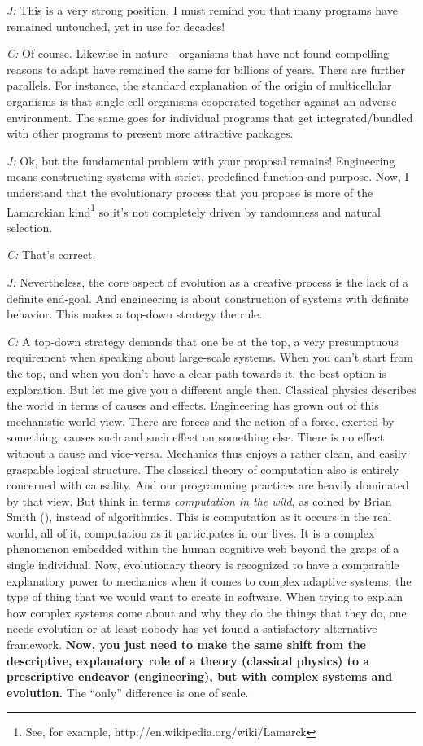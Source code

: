 \documentclass[10pt]{sigplanconf}
\begin{document}
\emph{J:} This is a very strong position. I must remind you that many programs have remained untouched, yet in use for decades!

\emph{C:} Of course. Likewise in nature - organisms that have not found compelling reasons to adapt have remained the same for billions of years. There are further parallels. For instance, the standard explanation of the origin of multicellular organisms is that single-cell organisms cooperated together against an adverse environment. The same goes for individual programs that get integrated/bundled with other programs to present more attractive packages.

\emph{J:} Ok, but the fundamental problem with your proposal remains! Engineering means constructing systems with strict, predefined function and purpose. Now, I understand that the evolutionary process that you propose is more of the Lamarckian kind\footnote{See, for example, http://en.wikipedia.org/wiki/Lamarck} so it's not completely driven by randomness and natural selection.

\emph{C:} That's correct.

\emph{J:} Nevertheless, the core aspect of evolution as a creative process is the lack of a definite end-goal. And engineering is about construction of systems with definite behavior. This makes a top-down strategy the rule.

\emph{C:} A top-down strategy demands that one be at the top, a very presumptuous requirement when speaking about large-scale systems. When you can't start from the top, and when you don't have a clear path towards it, the best option is exploration. But let me give you a different angle then. Classical physics describes the world in terms of causes and effects. Engineering has grown out of this mechanistic world view. There are forces and the action of a force, exerted by something, causes such and such effect on something else. There is no effect without a cause and vice-versa. Mechanics thus enjoys a rather clean, and easily graspable logical structure. The classical theory of computation also is entirely concerned with causality. And our programming practices are heavily dominated by that view. But think in terms \emph{computation in the wild}, as coined by Brian Smith (\cite{smith}), instead of algorithmics. This is computation as it occurs in the real world, all of it, computation as it participates in our lives. It is a complex phenomenon embedded within the human cognitive web beyond the graps of a single individual. Now, evolutionary theory is recognized to have a comparable explanatory power to mechanics when it comes to complex adaptive systems, the type of thing that we would want to create in software. When trying to explain how complex systems come about and why they do the things that they do, one needs evolution or at least nobody has yet found a satisfactory alternative framework. \textbf{Now, you just need to make the same shift from the descriptive, explanatory role of a theory (classical physics) to a prescriptive endeavor (engineering), but with complex systems and evolution.} The ``only'' difference is one of scale.
\end{document}
